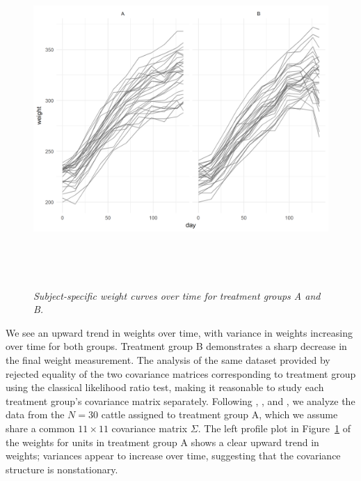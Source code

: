 \begin{center}  
\begin{figure}[H] 
\begin{center}
\includegraphics[width = 1.1\textwidth, height = 5in]{img/cattle/cattle-weights-vs-time-by-trt}
\caption{\textit{Subject-specific weight curves over time for treatment groups A and B.}}\label{fig:cattle-weights-by-trt}
\end{center}
\end{figure} 
\end{center}

We see an upward trend in weights over time, with variance in weights increasing over time for both groups. Treatment group B demonstrates a sharp decrease in the final weight measurement. The analysis of the same dataset provided by \cite{zimmerman1997structured} rejected equality of the two covariance matrices corresponding to treatment group using the classical likelihood ratio test, making it reasonable to study each treatment group's covariance matrix separately. Following \cite{pan2017jmcm}, \cite{zhang2015joint}, and \cite{pourahmadi1999joint}, we analyze the data from the $N = 30$ cattle assigned to treatment group A, which we assume share a common $11 \times 11$ covariance matrix $\Sigma$. The left profile plot in Figure~\ref{fig:cattle-weights-by-trt} of the weights for units in treatment group A shows a clear upward trend in weights;  variances appear to increase over time, suggesting that the covariance structure is nonstationary.

